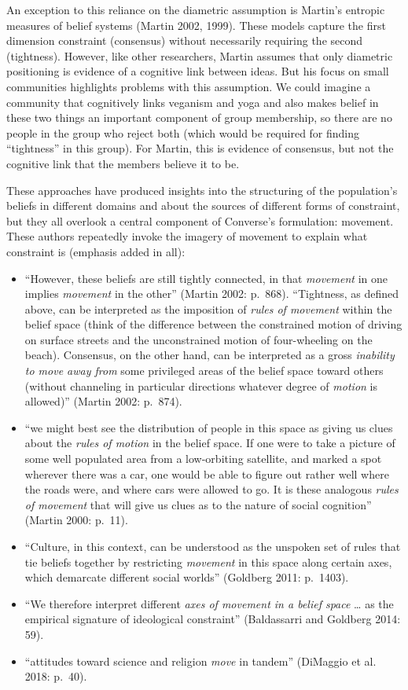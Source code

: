 \documentclass[12pt,]{article}
\begin{document}
An exception to this reliance on the diametric assumption is Martin's entropic measures of belief systems (Martin 2002, 1999). These models capture the first dimension constraint (consensus) without necessarily requiring the second (tightness). However, like other researchers, Martin assumes that only diametric positioning is evidence of a cognitive link between ideas. But his focus on small communities highlights problems with this assumption. We could imagine a community that cognitively links veganism and yoga and also makes belief in these two things an important component of group membership, so there are no people in the group who reject both (which would be required for finding ``tightness'' in this group). For Martin, this is evidence of consensus, but not the cognitive link that the members believe it to be.

These approaches have produced insights into the structuring of the population's beliefs in different domains and about the sources of different forms of constraint, but they all overlook a central component of Converse's formulation: movement. These authors repeatedly invoke the imagery of movement to explain what constraint is (emphasis added in all):

\begin{itemize}
\item
  ``However, these beliefs are still tightly connected, in that \emph{movement} in one implies \emph{movement} in the other'' (Martin 2002: p.~868). ``Tightness, as defined above, can be interpreted as the imposition of \emph{rules of movement} within the belief space (think of the difference between the constrained motion of driving on surface streets and the unconstrained motion of four-wheeling on the beach). Consensus, on the other hand, can be interpreted as a gross \emph{inability to move away from} some privileged areas of the belief space toward others (without channeling in particular directions whatever degree of \emph{motion} is allowed)'' (Martin 2002: p.~874).
\item
  ``we might best see the distribution of people in this space as giving us clues about the \emph{rules of motion} in the belief space. If one were to take a picture of some well populated area from a low-orbiting satellite, and marked a spot wherever there was a car, one would be able to figure out rather well where the roads were, and where cars were allowed to go. It is these analogous \emph{rules of movement} that will give us clues as to the nature of social cognition'' (Martin 2000: p.~11).
\item
  ``Culture, in this context, can be understood as the unspoken set of rules that tie beliefs together by restricting \emph{movement} in this space along certain axes, which demarcate different social worlds'' (Goldberg 2011: p.~1403).
\item
  ``We therefore interpret different \emph{axes of movement in a belief space} \ldots{} as the empirical signature of ideological constraint'' (Baldassarri and Goldberg 2014: 59).
\item
  ``attitudes toward science and religion \emph{move} in tandem'' (DiMaggio et al. 2018: p.~40).
\end{itemize}
\end{document}
